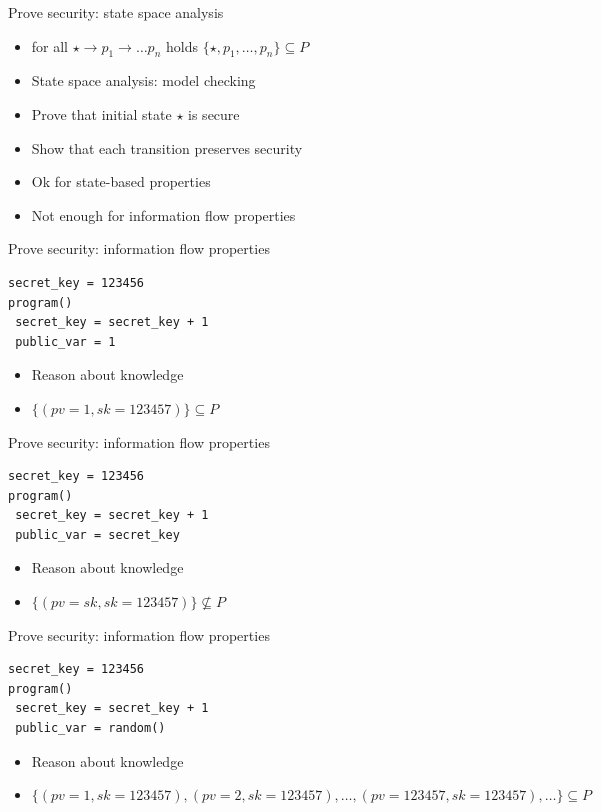 \documentclass{beamer}
\begin{document}
\begin{frame}{Prove security: state space analysis}
  \begin{itemize}
  \item for all $\star \rightarrow p_1 \rightarrow \dots p_n$ holds
    $\{\star, p_1, \dots, p_n\} \subseteq P$
  \item State space analysis: model checking
  \item<2-> Prove that initial state $\star$ is secure 
  \item<3-> Show that each transition preserves security
  \item<4-> Ok for state-based properties
  \item<4-> Not enough for information flow properties
  \end{itemize}
\end{frame}

\begin{frame}[fragile]{Prove security: information flow properties}
  \begin{verbatim}
secret_key = 123456
program()
 secret_key = secret_key + 1
 public_var = 1
  \end{verbatim}
  \begin{itemize}
  \item Reason about knowledge
  \item<2-> $\{(pv=1, sk=123457)\} \subseteq P$
  \end{itemize}
\end{frame}

\begin{frame}[fragile]{Prove security: information flow properties}
  \begin{verbatim}
secret_key = 123456
program()
 secret_key = secret_key + 1
 public_var = secret_key
  \end{verbatim}
  \begin{itemize}
  \item Reason about knowledge
  \item<2-> $\{(pv=sk, sk=123457)\} \not \subseteq P$
  \end{itemize}
\end{frame}

\begin{frame}[fragile]{Prove security: information flow properties}
  \begin{verbatim}
secret_key = 123456
program()
 secret_key = secret_key + 1
 public_var = random()
  \end{verbatim}
  \begin{itemize}
  \item Reason about knowledge
  \item<2-> $\{(pv=1, sk=123457), (pv=2, sk=123457), \dots ,
    (pv=123457, sk=123457), \dots\} \subseteq P$
  \end{itemize}
\end{frame}
\end{document}
